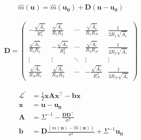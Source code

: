 \documentclass{beamer}
\providecommand{\brak}[1]{\ensuremath{\left(#1\right)}}
\begin{document}
\begin{frame}{}
    \begin{align}
        \hat{m}(\boldsymbol{u})=\hat{m}(\boldsymbol{u_0})+\boldsymbol{D}(\boldsymbol{u}-\boldsymbol{u_0})
    \end{align}
\end{frame}
\begin{frame}{}
    \begin{align}
        \boldsymbol{D} = \begin{pmatrix}
-\frac{\sqrt{\bar{A_e}}}{R_1^2} & \frac{\sqrt{\bar{A_e}}}{R_1R_2}      & \cdots & \frac{\sqrt{\bar{A_e}}}{R_1R_N}       & \frac{1}{2R_1\sqrt{\bar{A_e}}} \\
\frac{\sqrt{\bar{A_e}}}{R_2R_1}     & -\frac{\sqrt{\bar{A_e}}}{R_2^2} & \cdots & \frac{\sqrt{\bar{A_e}}}{R_2R_N}      & \frac{1}{2R_2\sqrt{\bar{A_e}}}\\
\vdots & \vdots & \ddots & \vdots  & \vdots  \\
 \frac{\sqrt{\bar{A_e}}}{R_NR_1}    & \frac{\sqrt{\bar{A_e}}}{R_NR_2}     & \cdots & -\frac{\sqrt{\bar{A_e}}}{R_N^2}&\frac{1}{2R_N\sqrt{\bar{A_e}}}  
\end{pmatrix}
    \end{align}
\end{frame}
\begin{frame}{}
\begin{align}
   \mathcal{L}^{\prime}&=\frac{1}{2}\boldsymbol{x}\boldsymbol{A}\boldsymbol{x}^{\top}-\boldsymbol{b}\boldsymbol{x}\\
   \boldsymbol{x}&= \boldsymbol{u}-\boldsymbol{u_0}\\
   \boldsymbol{A}&= \Sigma^{-1}-\frac{\boldsymbol{D}\boldsymbol{D}^{\top}}{\sigma^2}\\
   \boldsymbol{b}&=\boldsymbol{D}\frac{\brak{m(\boldsymbol{u})-\hat{m}(\boldsymbol{u})}}{\sigma^2}+\Sigma^{-1}\boldsymbol{u_0}
   \end{align}
\end{frame}
\end{document}
